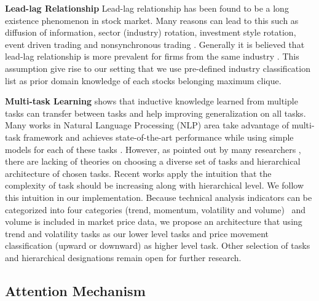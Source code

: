 \documentclass[sigconf, anonymous, review]{acmart}
\renewcommand{\citename}{\citet}
\renewcommand{\cite}{\citep}
\begin{document}
\textbf{Lead-lag Relationship} Lead-lag relationship has been
found to be a long existence phenomenon in stock market. Many
reasons can lead to this such as diffusion of information, sector
(industry) rotation, investment style rotation, event driven
trading and nonsynchronous trading
\cite{lo1990contrarian,chordia2000trading,conrad1988time,hameed1997time}.
Generally it is believed that lead-lag relationship is more
prevalent for firms from the same industry
\cite{hou2007industry}. This assumption give rise to our setting
that we use pre-defined industry classification list \cite{ths}
as prior domain knowledge of each stock\textquotesingle s belonging maximum
clique.

\textbf{Multi-task Learning} \citename{caruana1993multitask}
shows that inductive knowledge learned from multiple tasks can
transfer between tasks and help improving generalization on all
tasks. Many works in Natural Language Processing (NLP) area take
advantage of multi-task framework and achieves state-of-the-art
performance while using simple models for each of these tasks
\cite{sogaard2016deep,hashimoto2016joint}. However, as pointed
out by many researchers
\cite{caruana1993multitask,ruder2017overview}, there are lacking
of theories on choosing a diverse set of tasks and hierarchical
architecture of chosen tasks. Recent works
\cite{sogaard2016deep,hashimoto2016joint} apply the intuition
that the complexity of task should be increasing along with
hierarchical level. We follow this intuition in our
implementation. Because technical analysis indicators can be
categorized into four categories (trend, momentum, volatility and
volume)~\cite{kirkpatrick2010technical} and volume is included in
market price data, we propose an architecture that using trend
and volatility tasks as our lower level tasks and price movement
classification (upward or downward) as higher level task. Other
selection of tasks and hierarchical designations remain open for
further research.


\subsection{Attention Mechanism}
\label{sec:attn}
\end{document}
